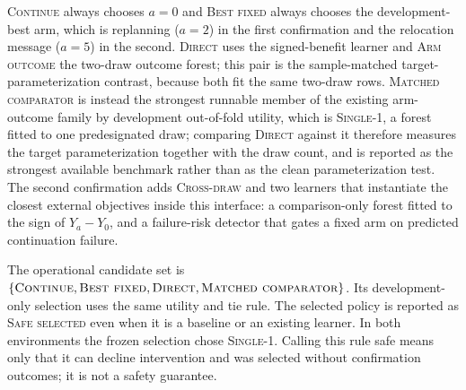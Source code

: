 \textsc{Continue} always chooses $a=0$ and \textsc{Best fixed} always chooses the development-best arm, which is replanning ($a=2$) in the first confirmation and the relocation message ($a=5$) in the second. \textsc{Direct} uses the signed-benefit learner and \textsc{Arm outcome} the two-draw outcome forest; this pair is the sample-matched target-parameterization contrast, because both fit the same two-draw rows. \textsc{Matched comparator} is instead the strongest runnable member of the existing arm-outcome family by development out-of-fold utility, which is \textsc{Single-1}, a forest fitted to one predesignated draw; comparing \textsc{Direct} against it therefore measures the target parameterization together with the draw count, and is reported as the strongest available benchmark rather than as the clean parameterization test. The second confirmation adds \textsc{Cross-draw} and two learners that instantiate the closest external objectives inside this interface: a comparison-only forest fitted to the sign of $Y_a-Y_0$, and a failure-risk detector that gates a fixed arm on predicted continuation failure.

The operational candidate set is $\{\textsc{Continue},\textsc{Best fixed},\textsc{Direct},\textsc{Matched comparator}\}$. Its development-only selection uses the same utility and tie rule. The selected policy is reported as \textsc{Safe selected} even when it is a baseline or an existing learner. In both environments the frozen selection chose \textsc{Single-1}. Calling this rule safe means only that it can decline intervention and was selected without confirmation outcomes; it is not a safety guarantee.

